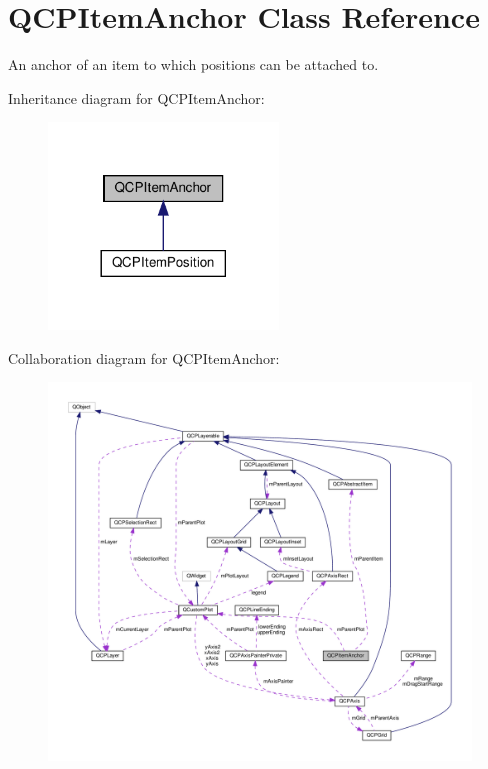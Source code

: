 \hypertarget{classQCPItemAnchor}{}\section{Q\+C\+P\+Item\+Anchor Class Reference}
\label{classQCPItemAnchor}


An anchor of an item to which positions can be attached to.  




Inheritance diagram for Q\+C\+P\+Item\+Anchor\+:\nopagebreak
\begin{figure}[H]
\begin{center}
\leavevmode
\includegraphics[width=173pt]{classQCPItemAnchor__inherit__graph}
\end{center}
\end{figure}


Collaboration diagram for Q\+C\+P\+Item\+Anchor\+:\nopagebreak
\begin{figure}[H]
\begin{center}
\leavevmode
\includegraphics[width=350pt]{classQCPItemAnchor__coll__graph}
\end{center}
\end{figure}
